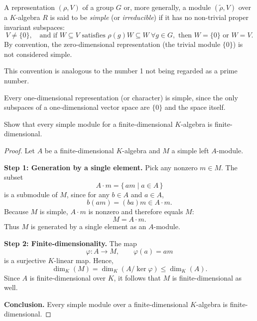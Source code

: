 \begin{definition}\label{def:simple}
A representation $(\rho,V)$ of a group $G$ or, more generally, a module $(\tilde{\rho},V)$ over a $K$-algebra $R$
is said to be \emph{simple} (or \emph{irreducible}) if it has no non-trivial proper invariant subspaces:
\[
V\ne\{0\}, \quad\text{and if } W\subseteq V\text{ satisfies }\rho(g)W\subseteq W\ \forall g\in G,\text{ then }W=\{0\}\text{ or }W=V.
\]
By convention, the zero-dimensional representation (the trivial module $\{0\}$) is not considered simple.
\end{definition}

\begin{remark}
This convention is analogous to the number 1 not being regarded as a prime number.
\end{remark}

\begin{example}\label{ex:simple-1D}
Every one-dimensional representation (or character) is simple,
since the only subspaces of a one-dimensional vector space are $\{0\}$ and the space itself.
\end{example}

\begin{exercise}[1.2.8]\label{ex:1.2.8}
Show that every simple module for a finite-dimensional $K$-algebra is finite-dimensional.
\end{exercise}

\begin{proof}
Let $A$ be a finite-dimensional $K$-algebra and $M$ a simple left $A$-module.

\smallskip
\noindent
\textbf{Step 1: Generation by a single element.}
Pick any nonzero $m\in M$.  
The subset
\[
A\cdot m = \{\,a m \mid a\in A\,\}
\]
is a submodule of $M$, since for any $b\in A$ and $a\in A$,
\[
b(a m) = (ba)m \in A\cdot m.
\]
Because $M$ is simple, $A\cdot m$ is nonzero and therefore equals $M$:
\[
M = A\cdot m.
\]
Thus $M$ is generated by a single element as an $A$-module.

\smallskip
\noindent
\textbf{Step 2: Finite-dimensionality.}
The map
\[
\varphi:A \longrightarrow M,\qquad \varphi(a)=a m
\]
is a surjective $K$-linear map.  
Hence,
\[
\dim_K(M) = \dim_K(A/\ker\varphi) \le \dim_K(A).
\]
Since $A$ is finite-dimensional over $K$, it follows that $M$ is finite-dimensional as well.

\smallskip
\noindent
\textbf{Conclusion.}
Every simple module over a finite-dimensional $K$-algebra is finite-dimensional.
\end{proof}

